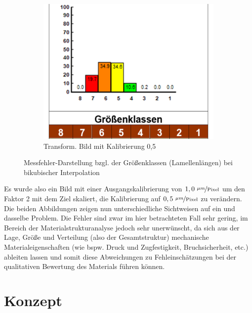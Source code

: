 \documentclass[
fontsize=10pt, 
listof = totoc,
parskip = half	
]{report}
\begin{document}
\begin{figure}[h]
\begin{subfigure}{0.33\textwidth}
	\end{subfigure}\hfill
	\begin{subfigure}{0.33\textwidth}
		\centering
		\includegraphics[scale=0.5]{pics/HistoCalib05.png}
		\caption{Transform. Bild mit Kalibrierung 0,5}
	\end{subfigure}
	\caption{Messfehler-Darstellung bzgl. der Größenklassen (Lamellenlängen) bei bikubischer Interpolation}
	\label{fig:ErrorGKL}
\end{figure}

\newpage

\noindent Es wurde also ein Bild mit einer Ausgangskalibrierung von $1,0~\nicefrac{\mu m}{\text{Pixel}}$ um den Faktor 2 mit dem Ziel skaliert, die Kalibrierung auf $0,5~\nicefrac{\mu m}{\text{Pixel}}$ zu verändern. Die beiden Abbildungen zeigen nun unterschiedliche Sichtweisen auf ein und dasselbe Problem. Die Fehler sind zwar im hier betrachteten Fall sehr gering, im Bereich der Materialstrukturanalyse jedoch sehr unerwünscht, da sich aus der Lage, Größe und Verteilung (also der Gesamtstruktur) mechanische Materialeigenschaften (wie bspw. Druck und Zugfestigkeit, Bruchsicherheit, etc.) ableiten lassen und somit diese Abweichungen zu Fehleinschätzungen bei der qualitativen Bewertung des Materials führen können.

\chapter{Konzept}
\label{ch:Konzept}
\end{document}
